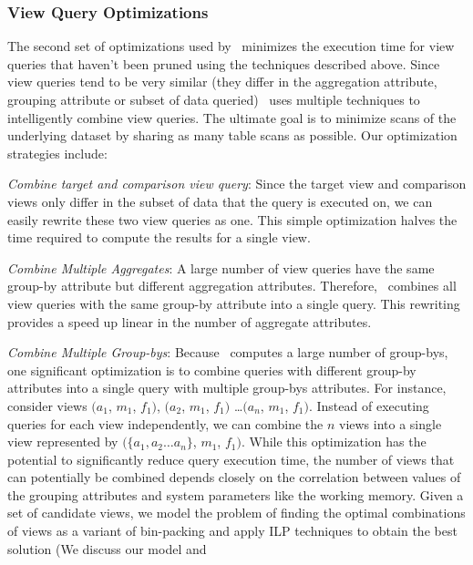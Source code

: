 \subsubsection{View Query Optimizations}
\label{subsubsec:optimizations}

The second set of optimizations used by \SeeDB\ minimizes the execution time for
view queries that haven't been pruned using the techniques described above.
Since view queries tend to be very similar (they differ in the aggregation
attribute, grouping attribute or subset of data queried) \SeeDB\ uses multiple
techniques to intelligently combine view queries.
The ultimate goal is to minimize scans of the underlying dataset by sharing as
many table scans as possible. Our optimization strategies include:

\begin{denselist}
  \item {\it Combine target and comparison view query}: Since the target view
  and comparison views only differ in the subset of data that the query is
  executed on, we can easily rewrite these two view queries as one.
  This simple optimization halves the time required to compute the results for
  a single view.
  \item {\it Combine Multiple Aggregates}: A large number of view
  queries have the same group-by attribute but different aggregation attributes.
  Therefore, \SeeDB\ combines all view queries with the same group-by attribute
  into a single query. This rewriting provides a speed up linear in the
  number of aggregate attributes.
  \item {\it Combine Multiple Group-bys}: 
  Because \SeeDB\ computes a large number of group-bys, one significant
  optimization is to combine queries with different
  group-by attributes into a single query with multiple group-bys attributes.
  For instance, consider views $(a_1$, $m_1$, $f_1)$, $(a_2$, $m_1$, $f_1)$
  \ldots $(a_n$, $m_1$, $f_1)$. Instead of executing queries for each view
  independently, we can combine the $n$ views into a single view represented by
  $(\{a_1, a_2\ldots a_n\}$, $m_1$, $f_1)$. 
  While this optimization has the potential to significantly reduce query
  execution time, the number of views that can potentially be combined depends
  closely on the correlation between values of the grouping attributes and system parameters like the
  working memory. Given a set of candidate views, we model the problem of
  finding the optimal combinations of views as a variant of bin-packing and
  apply ILP techniques to obtain the best solution (We discuss our model and

\end{denselist}
